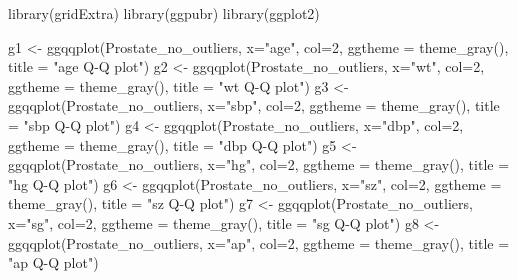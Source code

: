 \documentclass[
]{article}
\newenvironment{Shaded}{\begin{snugshade}}{\end{snugshade}}
\newcommand{\AttributeTok}[1]{\textcolor[rgb]{0.77,0.63,0.00}{#1}}
\newcommand{\DecValTok}[1]{\textcolor[rgb]{0.00,0.00,0.81}{#1}}
\newcommand{\FunctionTok}[1]{\textcolor[rgb]{0.00,0.00,0.00}{#1}}
\newcommand{\NormalTok}[1]{#1}
\newcommand{\OtherTok}[1]{\textcolor[rgb]{0.56,0.35,0.01}{#1}}
\newcommand{\StringTok}[1]{\textcolor[rgb]{0.31,0.60,0.02}{#1}}
\begin{document}
\begin{Shaded}
\begin{Highlighting}[]
\FunctionTok{library}\NormalTok{(gridExtra)}
\FunctionTok{library}\NormalTok{(ggpubr)}
\FunctionTok{library}\NormalTok{(ggplot2)}

\NormalTok{g1 }\OtherTok{\textless{}{-}} \FunctionTok{ggqqplot}\NormalTok{(Prostate\_no\_outliers, }\AttributeTok{x=}\StringTok{"age"}\NormalTok{, }\AttributeTok{col=}\DecValTok{2}\NormalTok{, }\AttributeTok{ggtheme =} \FunctionTok{theme\_gray}\NormalTok{(), }\AttributeTok{title =} \StringTok{"age Q{-}Q plot"}\NormalTok{)}
\NormalTok{g2 }\OtherTok{\textless{}{-}} \FunctionTok{ggqqplot}\NormalTok{(Prostate\_no\_outliers, }\AttributeTok{x=}\StringTok{"wt"}\NormalTok{, }\AttributeTok{col=}\DecValTok{2}\NormalTok{, }\AttributeTok{ggtheme =} \FunctionTok{theme\_gray}\NormalTok{(), }\AttributeTok{title =} \StringTok{"wt Q{-}Q plot"}\NormalTok{)}
\NormalTok{g3 }\OtherTok{\textless{}{-}} \FunctionTok{ggqqplot}\NormalTok{(Prostate\_no\_outliers, }\AttributeTok{x=}\StringTok{"sbp"}\NormalTok{, }\AttributeTok{col=}\DecValTok{2}\NormalTok{, }\AttributeTok{ggtheme =} \FunctionTok{theme\_gray}\NormalTok{(), }\AttributeTok{title =} \StringTok{"sbp Q{-}Q plot"}\NormalTok{)}
\NormalTok{g4 }\OtherTok{\textless{}{-}} \FunctionTok{ggqqplot}\NormalTok{(Prostate\_no\_outliers, }\AttributeTok{x=}\StringTok{"dbp"}\NormalTok{, }\AttributeTok{col=}\DecValTok{2}\NormalTok{, }\AttributeTok{ggtheme =} \FunctionTok{theme\_gray}\NormalTok{(), }\AttributeTok{title =} \StringTok{"dbp Q{-}Q plot"}\NormalTok{)}
\NormalTok{g5 }\OtherTok{\textless{}{-}} \FunctionTok{ggqqplot}\NormalTok{(Prostate\_no\_outliers, }\AttributeTok{x=}\StringTok{"hg"}\NormalTok{, }\AttributeTok{col=}\DecValTok{2}\NormalTok{, }\AttributeTok{ggtheme =} \FunctionTok{theme\_gray}\NormalTok{(), }\AttributeTok{title =} \StringTok{"hg Q{-}Q plot"}\NormalTok{)}
\NormalTok{g6 }\OtherTok{\textless{}{-}} \FunctionTok{ggqqplot}\NormalTok{(Prostate\_no\_outliers, }\AttributeTok{x=}\StringTok{"sz"}\NormalTok{, }\AttributeTok{col=}\DecValTok{2}\NormalTok{, }\AttributeTok{ggtheme =} \FunctionTok{theme\_gray}\NormalTok{(), }\AttributeTok{title =} \StringTok{"sz Q{-}Q plot"}\NormalTok{)}
\NormalTok{g7 }\OtherTok{\textless{}{-}} \FunctionTok{ggqqplot}\NormalTok{(Prostate\_no\_outliers, }\AttributeTok{x=}\StringTok{"sg"}\NormalTok{, }\AttributeTok{col=}\DecValTok{2}\NormalTok{, }\AttributeTok{ggtheme =} \FunctionTok{theme\_gray}\NormalTok{(), }\AttributeTok{title =} \StringTok{"sg Q{-}Q plot"}\NormalTok{)}
\NormalTok{g8 }\OtherTok{\textless{}{-}} \FunctionTok{ggqqplot}\NormalTok{(Prostate\_no\_outliers, }\AttributeTok{x=}\StringTok{"ap"}\NormalTok{, }\AttributeTok{col=}\DecValTok{2}\NormalTok{, }\AttributeTok{ggtheme =} \FunctionTok{theme\_gray}\NormalTok{(), }\AttributeTok{title =} \StringTok{"ap Q{-}Q plot"}\NormalTok{)}

\end{Highlighting}
\end{Shaded}
\end{document}

